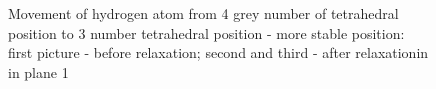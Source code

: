 \documentclass[11pt]{article}
\begin{document}
\begin{figure}[H]
\begin{minipage}[h]{0.3\linewidth}
\end{minipage}
\hfill
\begin{minipage}[h]{0.3\linewidth}
\end{minipage}
\caption{Movement of hydrogen atom from 4 grey number of tetrahedral position to 3 number tetrahedral position - more stable position: first picture - before relaxation; second and third - after relaxationin in plane 1}
\label{4to3}
\end{figure}
\end{document}
